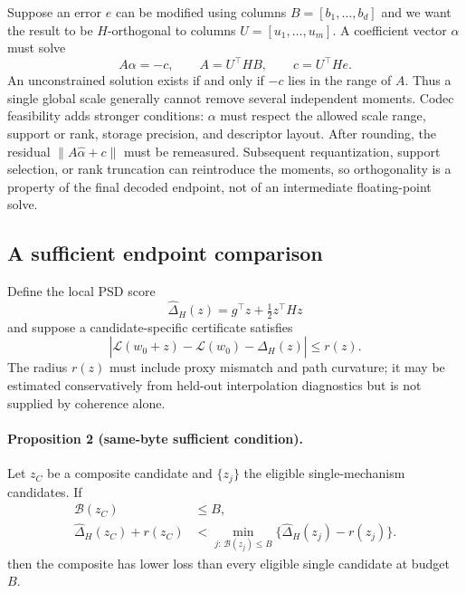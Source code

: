 Suppose an error $e$ can be modified using columns
$B=[b_1,\ldots,b_d]$ and we want the result to be $H$-orthogonal to
columns $U=[u_1,\ldots,u_m]$.  A coefficient vector $\alpha$ must solve
\begin{equation}
\label{eq:orthogonal-feasibility}
A\alpha=-c,\qquad A=U^\top HB,\qquad c=U^\top He.
\end{equation}
An unconstrained solution exists if and only if $-c$ lies in the range
of $A$.  Thus a single global scale generally cannot remove several
independent moments.  Codec feasibility adds stronger conditions:
$\alpha$ must respect the allowed scale range, support or rank, storage
precision, and descriptor layout.  After rounding, the residual
$\|A\widehat\alpha+c\|$ must be remeasured.  Subsequent requantization,
support selection, or rank truncation can reintroduce the moments, so
orthogonality is a property of the final decoded endpoint, not of an
intermediate floating-point solve.

\subsection{A sufficient endpoint comparison}

Define the local PSD score
\begin{equation}
\widehat\Delta_H(z)=g^\top z+\tfrac12 z^\top Hz
\end{equation}
and suppose a candidate-specific certificate satisfies
\begin{equation}
\left|\mathcal{L}(w_0+z)-\mathcal{L}(w_0)
-\widehat\Delta_H(z)\right|\le r(z).
\end{equation}
The radius $r(z)$ must include proxy mismatch and path curvature; it may
be estimated conservatively from held-out interpolation diagnostics but
is not supplied by coherence alone.

\paragraph{Proposition 2 (same-byte sufficient condition).}
Let $z_C$ be a composite candidate and $\{z_j\}$ the eligible
single-mechanism candidates.  If
\begin{equation}
\label{eq:certified-comparison}
\begin{split}
\mathcal{B}(z_C)&\le B,\\
\widehat\Delta_H(z_C)+r(z_C)
&<\min_{j:\,\mathcal{B}(z_j)\le B}
  \bigl\{\widehat\Delta_H(z_j)-r(z_j)\bigr\}.
\end{split}
\end{equation}
then the composite has lower loss than every eligible single candidate
at budget $B$.

